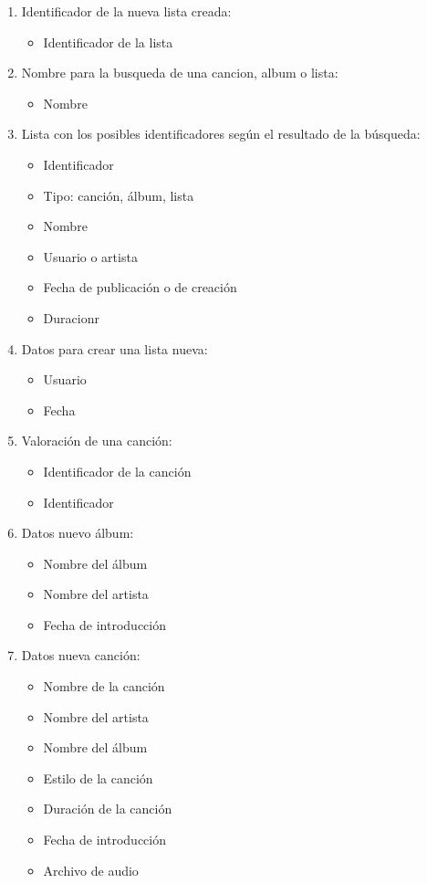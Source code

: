 \documentclass[12pt,a4paper]{article}
\begin{document}
\begin{enumerate}[label=\textnormal{RD\arabic*.}]
	\item Identificador de la nueva lista creada: \label{rd5}
		\begin{itemize}
			\item Identificador de la lista
		\end{itemize}
		
	\item Nombre para la busqueda de una cancion, album o lista: \label{rd6}
		\begin{itemize}
			\item Nombre
		\end{itemize}
		
	\item Lista con los posibles identificadores según el resultado de la búsqueda: \label{rd7}
		\begin{itemize}
			\item Identificador
			\item Tipo: canción, álbum, lista
			\item Nombre
			\item Usuario o artista
			\item Fecha de publicación o de creación
			\item Duracionr
		\end{itemize}
		
	\item Datos para crear una lista nueva: \label{rd8}
		\begin{itemize}
			\item Usuario
			\item Fecha 
		\end{itemize}
		
	\item Valoración de una canción: \label{rd9}
		\begin{itemize}
			\item Identificador de la canción
			\item Identificador
		\end{itemize}
		
	\item Datos nuevo álbum: \label{rd10}
		\begin{itemize}
		    \item Nombre del álbum
		    \item Nombre del artista
		    \item Fecha de introducción
		\end{itemize}
		
	\item Datos nueva canción: \label{rd11}
		\begin{itemize}
		    \item Nombre de la canción
		    \item Nombre del artista
		    \item Nombre del álbum
		    \item Estilo de la canción
		    \item Duración de la canción
		    \item Fecha de introducción
		    \item Archivo de audio
		\end{itemize}
		

\end{enumerate}
\end{document}
